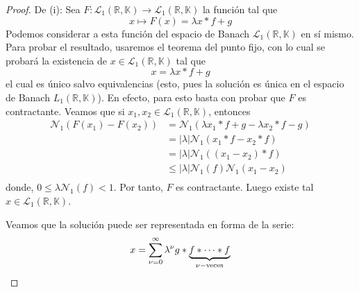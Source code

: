 \documentclass[12pt]{report}
\theoremstyle{largebreak}
\newcommand\abs[1]{\ensuremath{\left|#1\right|}}
\newcommand\cf[3]{\ensuremath{#1:#2\rightarrow#3}}
\newcommand{\N}[2]{\ensuremath{\mathcal{N}_{#1}\left(#2\right)}}
\begin{document}
    \begin{proof}
        De (i): Sea $\cf{F}{\mathcal{L}_1(\mathbb{R},\mathbb{K})}{\mathcal{L}_1(\mathbb{R},\mathbb{K})}$ la función tal que
        \begin{equation*}
            x\mapsto F(x)=\lambda x*f+g
        \end{equation*}
        Podemos considerar a esta función del espacio de Banach $\mathcal{L}_1(\mathbb{R},\mathbb{K})$ en sí mismo. Para probar el resultado, usaremos el teorema del punto fijo, con lo cual se probará la existencia de $x\in\mathcal{L}_1(\mathbb{R},\mathbb{K})$ tal que
        \begin{equation*}
            x=\lambda x*f+g
        \end{equation*}
        el cual es único salvo equivalencias (esto, pues la solución es única en el espacio de Banach $L_1(\mathbb{R},\mathbb{K})$). En efecto, para esto basta con probar que $F$ es contractante. Veamos que si $x_1,x_2\in\mathcal{L}_1(\mathbb{R},\mathbb{K})$, entonces
        \begin{equation*}
            \begin{split}
                \N{1}{F(x_1)-F(x_2)}&=\N{1}{\lambda x_1*f+g-\lambda x_2*f-g}\\
                &=\abs{\lambda}\N{1}{x_1*f-x_2*f}\\
                &=\abs{\lambda}\N{1}{(x_1-x_2)*f}\\
                &\leq\abs{\lambda}\N{1}{f}\N{1}{x_1-x_2}\\
            \end{split}
        \end{equation*}
        donde, $0\leq\lambda\N{1}{f}<1$. Por tanto, $F$ es contractante. Luego existe tal $x\in\mathcal{L}_1(\mathbb{R},\mathbb{K})$.

        Veamos que la solución puede ser representada en forma de la serie:
        \begin{equation*}
            x=\sum_{\nu=0}^\infty\lambda^\nu g*\underbrace{f*\cdots*f}_{\nu-\textup{veces}}
        \end{equation*}
        

\end{proof}
\end{document}
